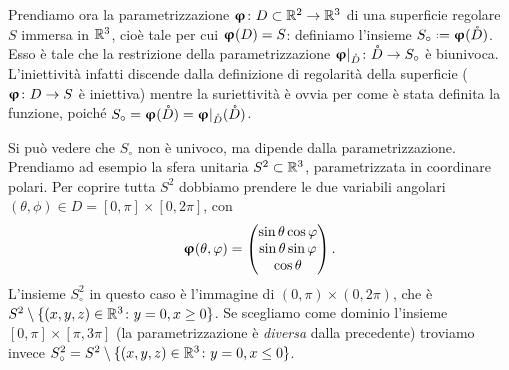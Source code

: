 Prendiamo ora la parametrizzazione $\bm{\upvarphi}\colon D\subset\mathbb{R}^2\to\mathbb{R}^3$ di una superficie regolare $S$ immersa in $\mathbb{R}^3$, cioè tale per cui $\bm{\upvarphi}(D)=S$: definiamo l'insieme $S_\circ\defeq\vphi(\mathring{D})$.
Esso è tale che la restrizione della parametrizzazione $\bm{\upvarphi}|_{\mathring{D}}\colon\mathring{D}\to S_\circ$ è biunivoca.
L'iniettività infatti discende dalla definizione di regolarità della superficie ($\bm{\upvarphi}\colon D\to S$ è iniettiva) mentre la suriettività è ovvia per come è stata definita la funzione, poich\'e $S_\circ=\bm{\upvarphi}(\mathring{D})=\bm{\upvarphi}|_{\mathring{D}}(\mathring{D})$.

Si può vedere che $S_\circ$ non è univoco, ma dipende dalla parametrizzazione.
Prendiamo ad esempio la sfera unitaria $S^2\subset\mathbb{R}^3$, parametrizzata in coordinare polari.
Per coprire tutta $S^2$ dobbiamo prendere le due variabili angolari $(\theta,\phi)\in D=[0,\pi]\times[0,2\pi]$, con
\begin{equation}
	\bm{\upvarphi}(\theta,\varphi)=
	\begin{pmatrix}
		\sin\theta\cos\varphi\\
		\sin\theta\sin\varphi\\
		\cos\theta
	\end{pmatrix}.
\end{equation}
L'insieme $S^2_\circ$ in questo caso è l'immagine di $(0,\pi)\times(0,2\pi)$, che è $S^2\setminus\{(x,y,z)\in\mathbb{R}^3\colon y=0,x\ge 0\}$.
Se scegliamo come dominio l'insieme $[0,\pi]\times[\pi,3\pi]$ (la parametrizzazione è \emph{diversa} dalla precedente) troviamo invece $S^2_\circ=S^2\setminus\{(x,y,z)\in\mathbb{R}^3\colon y=0,x\le 0\}$.

